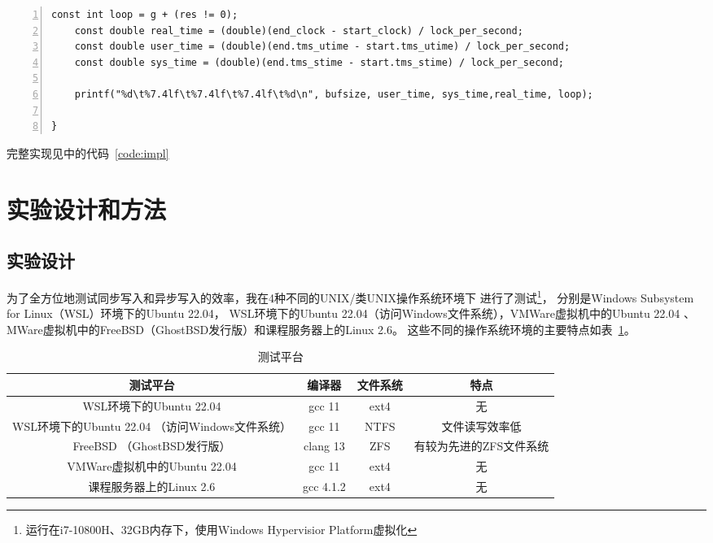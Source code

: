 \documentclass[a4paper,twoside]{article}
\begin{document}
\begin{spacing}{1.2}
\begin{lstlisting}[numbers=left,style=CppStyle,caption=程序关键部分,label={code:impl_key}]
    const int loop = g + (res != 0);
    const double real_time = (double)(end_clock - start_clock) / lock_per_second;
    const double user_time = (double)(end.tms_utime - start.tms_utime) / lock_per_second;
    const double sys_time = (double)(end.tms_stime - start.tms_stime) / lock_per_second;

    printf("%d\t%7.4lf\t%7.4lf\t%7.4lf\t%d\n", bufsize, user_time, sys_time,real_time, loop);

}
\end{lstlisting}

完整实现见中的代码~\ref{code:impl}

\section{实验设计和方法}

\subsection{实验设计}

为了全方位地测试同步写入和异步写入的效率，我在4种不同的UNIX/类UNIX操作系统环境下
进行了测试\footnote{运行在i7-10800H、32GB内存下，使用Windows Hypervisior Platform虚拟化}，
分别是Windows Subsystem for Linux（WSL）环境下的Ubuntu 22.04，
WSL环境下的Ubuntu 22.04（访问Windows文件系统），VMWare虚拟机中的Ubuntu 22.04
、MWare虚拟机中的FreeBSD（GhostBSD发行版）和课程服务器上的Linux 2.6。
这些不同的操作系统环境的主要特点如表~\ref{tbl:oss}。

\begin{table}[htbp]
	\centering
	\caption{测试平台}
	\label{tbl:oss}
	\begin{tabular}{c|c|c|c}
		\toprule
		\hline
		测试平台 & 编译器 & 文件系统 & 特点  \\
		\hline
		WSL环境下的Ubuntu 22.04 & gcc 11 & ext4 & 无 \\
		\hline
		WSL环境下的Ubuntu 22.04 （访问Windows文件系统） & gcc 11 & NTFS & 文件读写效率低\cite{githubwsl2Filesystem} \\
		\hline
		FreeBSD （GhostBSD发行版） & clang 13 & ZFS & 有较为先进的ZFS文件系统\cite{rodeh2003zfs} \\
		\hline
		VMWare虚拟机中的Ubuntu 22.04 & gcc 11 & ext4 & 无  \\
		\hline
		课程服务器上的Linux 2.6 & gcc 4.1.2 & ext4 & 无  \\
		\hline
		\bottomrule
	\end{tabular}
\end{table}


\end{spacing}
\end{document}
